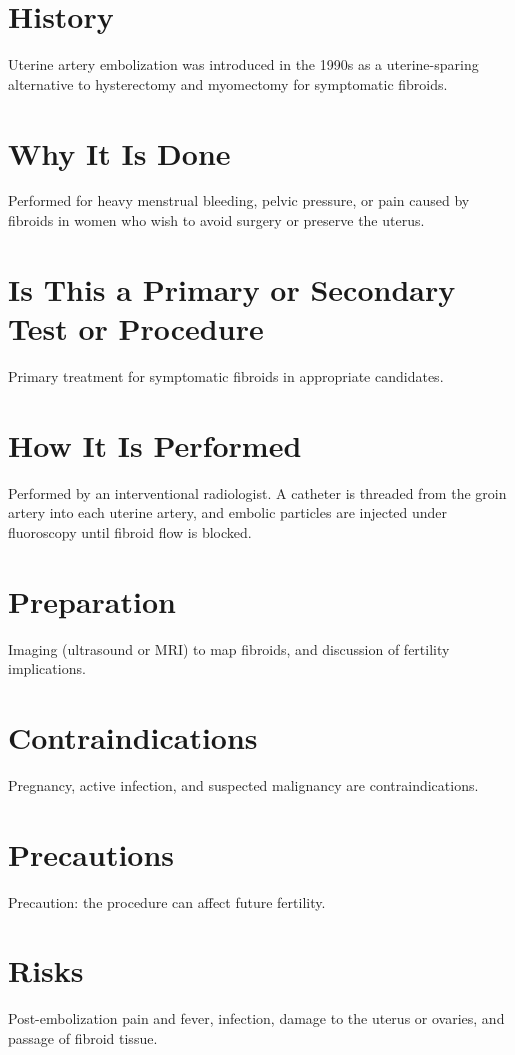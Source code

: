 \section*{History}
Uterine artery embolization was introduced in the 1990s as a uterine-sparing alternative to hysterectomy and myomectomy for symptomatic fibroids.

\section*{Why It Is Done}
Performed for heavy menstrual bleeding, pelvic pressure, or pain caused by fibroids in women who wish to avoid surgery or preserve the uterus.

\section*{Is This a Primary or Secondary Test or Procedure}
Primary treatment for symptomatic fibroids in appropriate candidates.

\section*{How It Is Performed}
Performed by an interventional radiologist. A catheter is threaded from the groin artery into each uterine artery, and embolic particles are injected under fluoroscopy until fibroid flow is blocked.

\section*{Preparation}
Imaging (ultrasound or MRI) to map fibroids, and discussion of fertility implications.

\section*{Contraindications}
Pregnancy, active infection, and suspected malignancy are contraindications.

\section*{Precautions}
Precaution: the procedure can affect future fertility.

\section*{Risks}
Post-embolization pain and fever, infection, damage to the uterus or ovaries, and passage of fibroid tissue.

